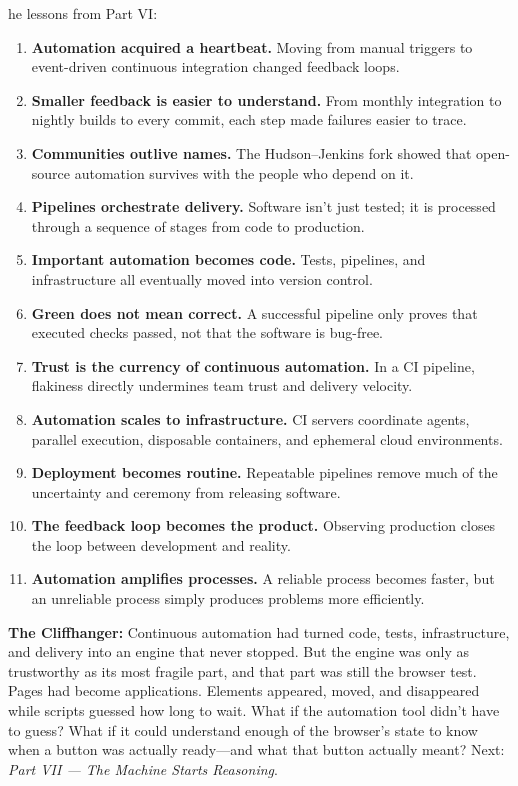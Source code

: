 \documentclass[11pt, a4paper, openany]{book}
\newcommand{\initialcap}[1]{{\fontfamily{lmss}\selectfont\huge\textbf{#1}}}
\begin{document}
\noindent \initialcap{T}he lessons from Part VI:
\begin{enumerate}
    \item \textbf{Automation acquired a heartbeat.} Moving from manual triggers to event-driven continuous integration changed feedback loops.
    \item \textbf{Smaller feedback is easier to understand.} From monthly integration to nightly builds to every commit, each step made failures easier to trace.
    \item \textbf{Communities outlive names.} The Hudson--Jenkins fork showed that open-source automation survives with the people who depend on it.
    \item \textbf{Pipelines orchestrate delivery.} Software isn't just tested; it is processed through a sequence of stages from code to production.
    \item \textbf{Important automation becomes code.} Tests, pipelines, and infrastructure all eventually moved into version control.
    \item \textbf{Green does not mean correct.} A successful pipeline only proves that executed checks passed, not that the software is bug-free.
    \item \textbf{Trust is the currency of continuous automation.} In a CI pipeline, flakiness directly undermines team trust and delivery velocity.
    \item \textbf{Automation scales to infrastructure.} CI servers coordinate agents, parallel execution, disposable containers, and ephemeral cloud environments.
    \item \textbf{Deployment becomes routine.} Repeatable pipelines remove much of the uncertainty and ceremony from releasing software.
    \item \textbf{The feedback loop becomes the product.} Observing production closes the loop between development and reality.
    \item \textbf{Automation amplifies processes.} A reliable process becomes faster, but an unreliable process simply produces problems more efficiently.
\end{enumerate}

\noindent \textbf{The Cliffhanger:} Continuous automation had turned code, tests, infrastructure, and delivery into an engine that never stopped. But the engine was only as trustworthy as its most fragile part, and that part was still the browser test. Pages had become applications. Elements appeared, moved, and disappeared while scripts guessed how long to wait. What if the automation tool didn't have to guess? What if it could understand enough of the browser's state to know when a button was actually ready---and what that button actually meant? Next: \textit{Part VII --- The Machine Starts Reasoning}.
\end{document}
